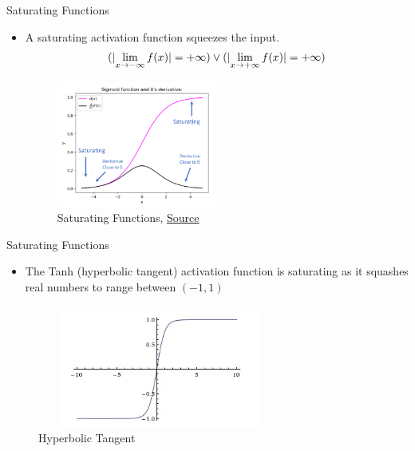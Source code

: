 \DeclarePairedDelimiter\abs{\lvert}{\rvert}%
\begin{frame}{Saturating Functions}
	\begin{itemize}
		\item A saturating activation function squeezes the input.
		\begin{align*}
			(\abs{\lim_{x \to -\infty}f(x)}=+\infty)
			\vee (\abs{\lim_{x \to +\infty}f(x)}=+\infty)
		\end{align*}
		\begin{figure}[H]
			\centering
			\includegraphics[width=0.5\textwidth]{Figs/van_1.png}
			\caption{Saturating Functions, \href{https://www.analyticsvidhya.com/blog/2021/06/the-challenge-of-vanishing-exploding-gradients-in-deep-neural-networks/}{Source}}
		\end{figure}
	\end{itemize}
\end{frame}

\begin{frame}{Saturating Functions}
	\begin{itemize}
		\item The Tanh (hyperbolic tangent) activation function is saturating as it squashes real numbers to range between $(-1, 1)$
	\end{itemize}
	\begin{figure}
		\centering
		\includegraphics[width=8cm, height=4cm]{Figs/TANH.png}
		\caption{Hyperbolic Tangent}
	\end{figure}
\end{frame}

